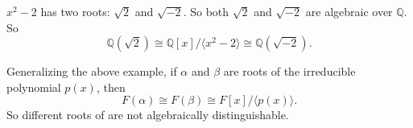 \begin{example}
	$x^2-2$ has two roots: $\sqrt 2$ and $\sqrt{-2}$. So both $\sqrt 2$ and $\sqrt{-2}$ are algebraic over $\mathbb Q$. So
	$$\mathbb Q(\sqrt 2)\cong\mathbb Q[x]/\langle x^2-2\rangle\cong\mathbb Q(\sqrt{-2}).$$
\end{example}

Generalizing the above example, if $\alpha$ and $\beta$ are roots of the irreducible polynomial $p(x)$, then
$$F(\alpha)\cong F(\beta)\cong F[x]/\langle p(x)\rangle.$$
So different roots of are not algebraically distinguishable.